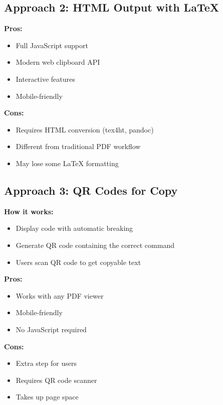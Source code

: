 \documentclass{article}
\begin{document}
\subsection{Approach 2: HTML Output with LaTeX}

\begin{tcolorbox}[colback=green!5, colframe=green!40, title=HTML Conversion Solution]
\textbf{Pros:}
\begin{itemize}
    \item Full JavaScript support
    \item Modern web clipboard API
    \item Interactive features
    \item Mobile-friendly
\end{itemize}

\textbf{Cons:}
\begin{itemize}
    \item Requires HTML conversion (tex4ht, pandoc)
    \item Different from traditional PDF workflow
    \item May lose some LaTeX formatting
\end{itemize}
\end{tcolorbox}

\subsection{Approach 3: QR Codes for Copy}

\begin{tcolorbox}[colback=orange!5, colframe=orange!40, title=QR Code Solution]
\textbf{How it works:}
\begin{itemize}
    \item Display code with automatic breaking
    \item Generate QR code containing the correct command
    \item Users scan QR code to get copyable text
\end{itemize}

\textbf{Pros:}
\begin{itemize}
    \item Works with any PDF viewer
    \item Mobile-friendly
    \item No JavaScript required
\end{itemize}

\textbf{Cons:}
\begin{itemize}
    \item Extra step for users
    \item Requires QR code scanner
    \item Takes up page space
\end{itemize}
\end{tcolorbox}
\end{document}
